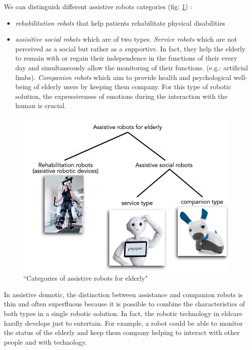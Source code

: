 \documentclass{thesisreport}
\begin{document}
 We can distinguish different assistive robots categories (fig: \ref{fig:typeRobot}) \cite{assistiveRobots}:
 \begin{itemize}
     \item \textit{rehabilitation robots} that help patients rehabilitate physical disabilities
     \item \textit{assisitive social robots} which are of two types. \emph{Service robots} which are not perceived as a social but rather as a supportive. In fact, they help the elderly to remain with or regain their independence in the functions of their every day and simultaneously allow the monitoring of their functions. (e.g.: artificial limbs). \emph{Companion robots} which aim to provide health and psychological well-being of elderly users by keeping them company. For this type of robotic solution, the expressiveness of emotions during the interaction with the human is crucial.
 \end{itemize}
 
 \begin{figure}[ht]
	\centering
	\includegraphics[width=14cm]{Thesis/data/TypeRobot.jpg}
	\caption{``Categories of assistive robots for elderly" \cite{assistiveRobots}}
	\label{fig:typeRobot}
 \end{figure}
 
 In assistive domotic, the distinction between assistance and companion robots is thin and often superfluous because it is possible to combine the characteristics of both types in a single robotic solution. In fact, the robotic technology in eldcare hardly develops just to entertain.
 For example, a robot could be able to monitor the status of the elderly and keep them company helping to interact with other people and with technology.
 
\end{document}
